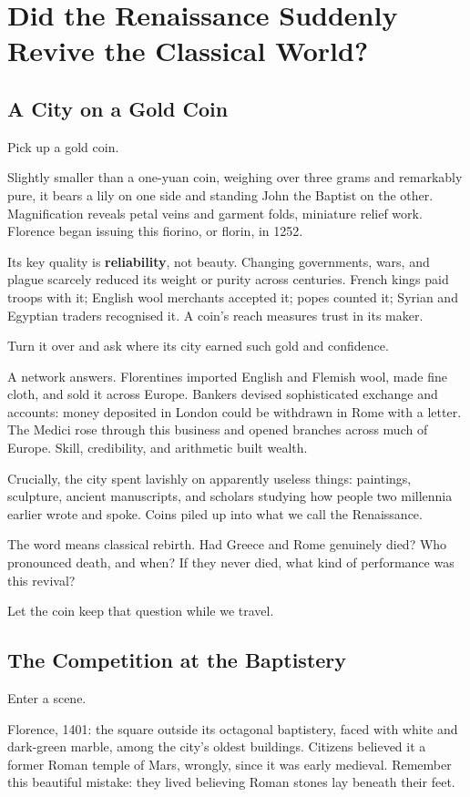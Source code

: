 \chapter[Did Antiquity Suddenly Come Back?]{Did the Renaissance Suddenly Revive the Classical World?}
\section{A City on a Gold Coin}
Pick up a gold coin.

Slightly smaller than a one-yuan coin, weighing over three grams and remarkably pure, it bears a lily on one side and standing John the Baptist on the other. Magnification reveals petal veins and garment folds, miniature relief work. Florence began issuing this fiorino, or florin, in 1252.

Its key quality is \textbf{reliability}, not beauty. Changing governments, wars, and plague scarcely reduced its weight or purity across centuries. French kings paid troops with it; English wool merchants accepted it; popes counted it; Syrian and Egyptian traders recognised it. A coin's reach measures trust in its maker.

Turn it over and ask where its city earned such gold and confidence.

A network answers. Florentines imported English and Flemish wool, made fine cloth, and sold it across Europe. Bankers devised sophisticated exchange and accounts: money deposited in London could be withdrawn in Rome with a letter. The Medici rose through this business and opened branches across much of Europe. Skill, credibility, and arithmetic built wealth.

Crucially, the city spent lavishly on apparently useless things: paintings, sculpture, ancient manuscripts, and scholars studying how people two millennia earlier wrote and spoke. Coins piled up into what we call the Renaissance.

The word means classical rebirth. Had Greece and Rome genuinely died? Who pronounced death, and when? If they never died, what kind of performance was this revival?

Let the coin keep that question while we travel.

\section{The Competition at the Baptistery}
Enter a scene.

Florence, 1401: the square outside its octagonal baptistery, faced with white and dark-green marble, among the city's oldest buildings. Citizens believed it a former Roman temple of Mars, wrongly, since it was early medieval. Remember this beautiful mistake: they lived believing Roman stones lay beneath their feet.

